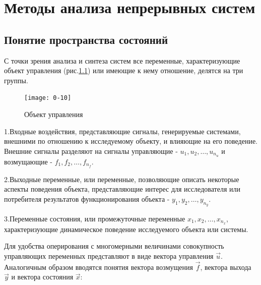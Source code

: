 \chapter{Методы анализа непрерывных систем}
\section{Понятие пространства состояний}



		С точки зрения анализа и синтеза систем все переменные, характеризующие объект управления (рис.\ref{fig:0_10}) %
		 или имеющие к нему
		отношение, делятся на три группы.



\bigskip
\begin{figure}[h!]
	\centering
	\texttt{[image: 0-10]}
	\caption{Объект управления}
	\label{fig:0_10}
\end{figure}


\bigskip


		1.Входные воздействия, представляющие сигналы, генерируемые сис­темами, внешними по отношению к исследуемому объекту, и
		влияющие на его поведение. Внешние сигналы разделяют на сигналы управляющие -  $u_1,u_2,\ldots,u_{n_u}$ и
		возмущающие -  $f_1,f_2,\ldots,f_{n_f}$.



		2.Выходные переменные, или переменные, позволяющие описать некоторые аспекты поведения объекта, представляющие интерес	для иссле­дователя или потребителя результатов функционирования объекта - $y_1,y_2,\ldots,y_{n_y}$.



		3.Переменные состояния, или промежуточные переменные  $x_1,x_2,\ldots,x_{n_x}$, характеризующие динамическое
		поведение исследуемого объекта или системы.



		Для удобства оперирования с многомерными величинами совокупность управляющих переменных представляют в виде вектора
		управления  $\vec u$. Аналогичным образом вводятся понятия вектора возмущения  $\vec f$, вектора выхода  $\vec y$ и
		вектора состояния  $\vec{x}$:



\bigskip

